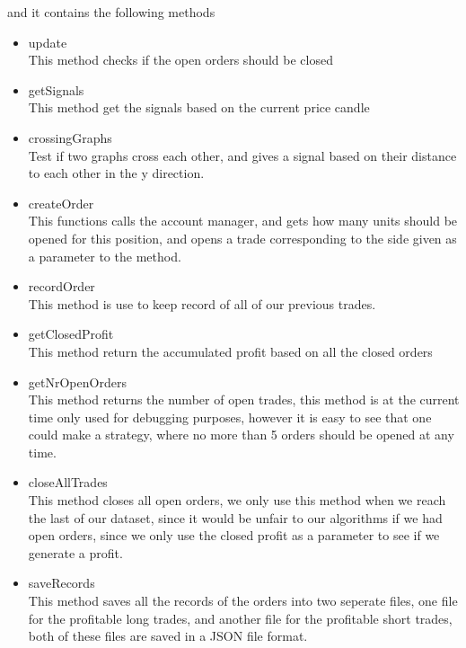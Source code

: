 and it contains the following methods
\begin{itemize}
\item{update}
\\
This method checks if the open orders should be closed
\item{getSignals}\\
This method get the signals based on the current price candle
\item{crossingGraphs}\\
Test if two graphs cross each other, and gives a signal based  on their distance to each other in the y direction.
\item{createOrder}\\
This functions calls the account manager, and gets how many units should be opened for this position, and opens a trade corresponding to the side given as a parameter to the method.
\item{recordOrder}\\
This method is use to keep record of all of our previous trades.
\item{getClosedProfit}\\
This method return the accumulated profit based on all the closed orders
\item{getNrOpenOrders}\\
This method returns the number of open trades, this method is at the current time only used for debugging purposes, however it is easy to see that one could make a strategy, where no more than 5 orders should be opened at any time.
\item{closeAllTrades}\\
This method closes all open orders, we only use this method when we reach the last of our dataset, since it would be unfair to our algorithms if we had open orders, since we only use the closed profit as a parameter to see if we generate a profit.
\item{saveRecords}\\
This method saves all the records of the orders into two seperate files, one file for the profitable long trades, and another file for the profitable short trades, both of these files are saved in a JSON file format.
\end{itemize}


